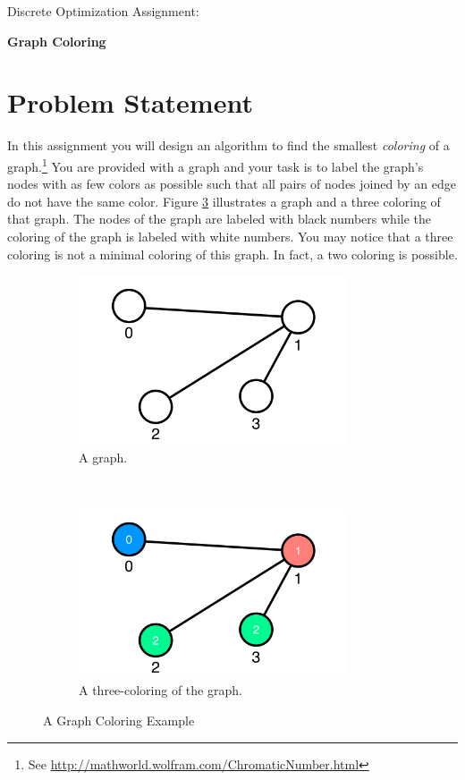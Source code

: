 \documentclass[11pt]{article}
\begin{document}
\huge
\noindent
{Discrete Optimization Assignment:}
\vspace{0.25cm}

\noindent
{\bf Graph Coloring}
\normalsize


\section{Problem Statement}

In this assignment you will design an algorithm to find the smallest {\em coloring} of a graph.\footnote{See \url{http://mathworld.wolfram.com/ChromaticNumber.html}}  You are provided with a graph and your task is to label the graph's nodes with as few colors as possible such that all pairs of nodes joined by an edge do not have the same color.  Figure \ref{fig:graph} illustrates a graph and a three coloring of that graph.  The nodes of the graph are labeled with black numbers while the coloring of the graph is labeled with white numbers.  You may notice that a three coloring is not a minimal coloring of this graph.  In fact, a two coloring is possible.

\begin{figure}[h]
        \centering
        \begin{subfigure}[b]{8.0cm}%
                \centering
                \includegraphics[width=8cm]{figures/coloring_1.pdf}
                \caption{A graph.}
                \label{fig:graph:input}
        \end{subfigure}%
        ~ %
        \begin{subfigure}[b]{8.0cm}
                \centering
                \includegraphics[width=8cm]{figures/coloring_2.pdf}
                \caption{A three-coloring of the graph.}
                \label{fig:graph:coloring}
        \end{subfigure}
        \caption{A Graph Coloring Example}\label{fig:graph}
\end{figure}
\end{document}
